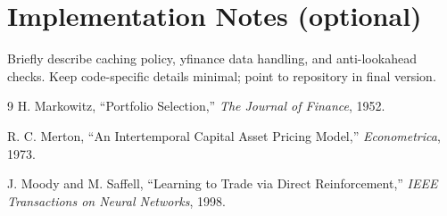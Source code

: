 \documentclass[10pt,twocolumn]{article}
\begin{document}
\section{Implementation Notes (optional)}
Briefly describe caching policy, yfinance data handling, and anti-lookahead checks. Keep code-specific details minimal; point to repository in final version.

\begin{thebibliography}{9}
H. Markowitz, ``Portfolio Selection,'' \emph{The Journal of Finance}, 1952.

R. C. Merton, ``An Intertemporal Capital Asset Pricing Model,'' \emph{Econometrica}, 1973.

J. Moody and M. Saffell, ``Learning to Trade via Direct Reinforcement,'' \emph{IEEE Transactions on Neural Networks}, 1998.
\end{thebibliography}
\end{document}
